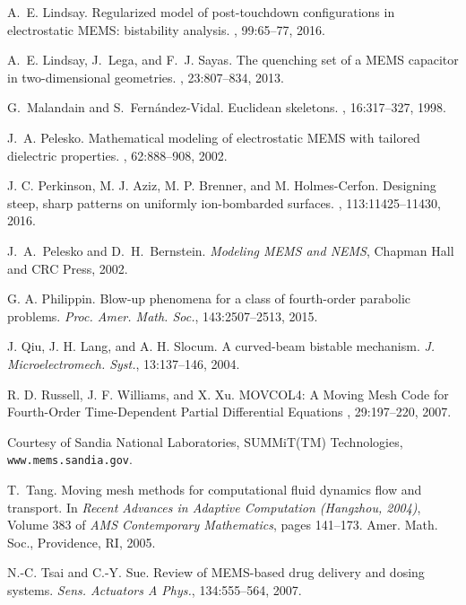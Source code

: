 \documentclass{siamart0516}
\theoremstyle{plain}%
\theoremstyle{definition}
\theoremstyle{remark}
\begin{document}
\begin{thebibliography}{10}
A.~E. Lindsay.
\newblock Regularized model of post-touchdown configurations in electrostatic
  {MEMS}: bistability analysis.
, 99:65--77, 2016.

A.~E. Lindsay, J.~Lega, and F.~J. Sayas.
\newblock The quenching set of a {MEMS} capacitor in two-dimensional geometries.
, 23:807--834, 2013.

G.~Malandain and S.~Fern{\'a}ndez-Vidal.
\newblock Euclidean skeletons.
, 16:317--327, 1998.

J.~A. Pelesko.
\newblock Mathematical modeling of electrostatic {MEMS} with tailored
  dielectric properties.
, 62:888--908, 2002.

 J. C. Perkinson, M. J. Aziz, M. P. Brenner, and M. Holmes-Cerfon.
\newblock Designing steep, sharp patterns on uniformly ion-bombarded surfaces.
, 113:11425--11430, 2016.

 J.~A.~Pelesko and D.~H.~Bernstein.
{\em Modeling MEMS and NEMS},
Chapman Hall and CRC Press, 2002.

 G. A. Philippin.
Blow-up phenomena for a class of fourth-order parabolic problems.
{\em Proc. Amer. Math. Soc.}, 143:2507--2513, 2015.

 J. Qiu, J. H. Lang, and A. H. Slocum.
A curved-beam bistable mechanism.
{\em J. Microelectromech. Syst.}, 13:137--146, 2004.

 R. D. Russell, J. F. Williams, and X. Xu.
\newblock MOVCOL4: A Moving Mesh Code for Fourth-Order Time-Dependent Partial Differential Equations
, 29:197--220, 2007.

 Courtesy of Sandia National Laboratories, SUMMiT(TM) Technologies,
{\tt www.mems.sandia.gov}.

T.~Tang.
\newblock Moving mesh methods for computational fluid dynamics flow and transport.
\newblock In {\em Recent Advances in Adaptive Computation (Hangzhou, 2004)},
  Volume 383 of {\em AMS Contemporary Mathematics}, pages 141--173. Amer. Math.
  Soc., Providence, RI, 2005.

 N.-C. Tsai and C.-Y. Sue.
Review of MEMS-based drug delivery and dosing systems.
{\em Sens. Actuators A Phys.}, 134:555--564, 2007.


\end{thebibliography}
\end{document}
